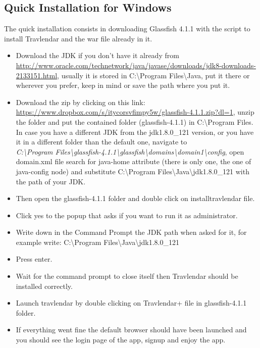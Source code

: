 \subsection{Quick Installation for Windows}
The quick installation consists in downloading Glassfish 4.1.1 with the script to install Travlendar and the war file already in it.
\begin{itemize}
\item Download the JDK if you don't have it already from\\ \href{url}{http://www.oracle.com/technetwork/java/javase/downloads/jdk8-downloads-2133151.html}, usually it is stored in C:\textbackslash Program Files\textbackslash Java, put it there or wherever you prefer, keep in mind or save the path where you put it.
\item Download the zip by clicking on this link:\\ \href{url}{https://www.dropbox.com/s/itycorsvfimpy5w/glassfish-4.1.1.zip?dl=1}, unzip the folder and put the contained folder (glassfish-4.1.1) in C:\textbackslash Program Files.
In case you have a different JDK from the jdk1.8.0_121 version, or you have it in a different folder than the default one, navigate to\\ \textit{C:\textbackslash Program Files\textbackslash glassfish-4.1.1\textbackslash glassfish\textbackslash domains\textbackslash domain1\textbackslash config}, open domain.xml file search for java-home attribute (there is only one, the one of java-config node) and substitute C:\textbackslash Program Files\textbackslash Java\textbackslash jdk1.8.0_121 with the path of your JDK.
\item Then open the glassfish-4.1.1 folder and double click on installtravlendar file.
\item Click yes to the popup that asks if you want to run it as administrator.
\item Write down in the Command Prompt the JDK path when asked for it, for example write: C:\textbackslash Program Files\textbackslash Java\textbackslash jdk1.8.0_121
\item Press enter.
\item Wait for the command prompt to close itself then Travlendar should be installed correctly.
\item Launch travlendar by double clicking on Travlendar+ file in glassfish-4.1.1 folder.
\item If everything went fine the default browser should have been launched and you should see the login page of the app, signup and enjoy the app.
\end{itemize}


